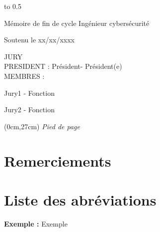 \documentclass[12pt]{article}
\newcommand\titre{Mémoire de fin de cycle Ingénieur cybersécurité}      %
\newcommand\dateSoutenance{xx/xx/xxxx}
\newcommand\presidentJury{Président}
\newcommand\membresJury{
    Jury1 - Fonction

    Jury2 - Fonction
}
\newcommand\piedDePage{Pied de page}
\begin{document}
\begin{titlepage}
\begin{center}
        \centerline{\hbox to 0.5\textwidth{\hrulefill}}
        \vspace*{1cm}

        \titre\\
        \vspace*{0.5cm}


        Soutenu le \dateSoutenance\\
        \vspace*{0.5cm}


    \end{center}

    {\parindent0pt
        JURY\\
        PRESIDENT : \presidentJury - Président(e)\\
        MEMBRES : 
        
        \membresJury

    }

    \begin{textblock*}{\textwidth}(0cm,27cm)
        {\small \textit{\piedDePage}}
    \end{textblock*}


\end{titlepage}
\clearpage
\setcounter{page}{2}
\thispagestyle{empty}
\null
\newpage
{}
\section*{Remerciements}
\newpage
\tableofcontents


\newpage
{}
\listoffigures

\newpage

\section*{Liste des abréviations}

\textbf{Exemple :} Exemple\\

\newpage
\end{document}
